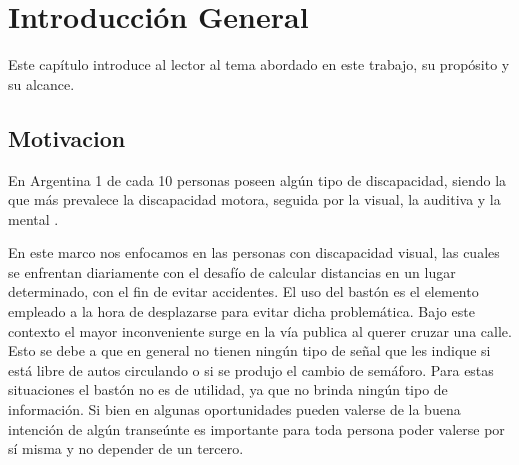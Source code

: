 
\chapter{Introducción General} %

\label{Chapter1} %
\label{IntroGeneral}


\newcommand{\keyword}[1]{\textbf{#1}}
\newcommand{\tabhead}[1]{\textbf{#1}}
\newcommand{\code}[1]{\texttt{#1}}
\newcommand{\file}[1]{\texttt{\bfseries#1}}
\newcommand{\option}[1]{\texttt{\itshape#1}}
\newcommand{\grados}{$^{\circ}$}




Este capítulo introduce al lector al tema abordado en este trabajo, su propósito y su alcance.

\section{Motivacion}

En Argentina 1 de cada 10 personas poseen algún tipo de discapacidad, siendo la que más prevalece la discapacidad motora, seguida por la visual, la auditiva y la mental \cite{estudioIndec}.

En este marco nos enfocamos en las personas con discapacidad visual, las cuales se enfrentan diariamente con el desafío de calcular distancias en un lugar determinado, con el fin de evitar accidentes. El uso del bastón es el elemento empleado a la hora de desplazarse para evitar dicha problemática. Bajo este contexto el mayor inconveniente surge en la vía publica al querer cruzar una calle.  Esto se debe a que en general no tienen ningún tipo de señal que les indique si está libre de autos circulando o si se produjo el cambio de semáforo. Para estas situaciones el bastón no es de utilidad, ya que no brinda ningún tipo de información. Si bien en algunas oportunidades pueden valerse de la buena intención de algún transeúnte es importante para toda persona poder valerse por sí misma y no depender de un tercero. 

